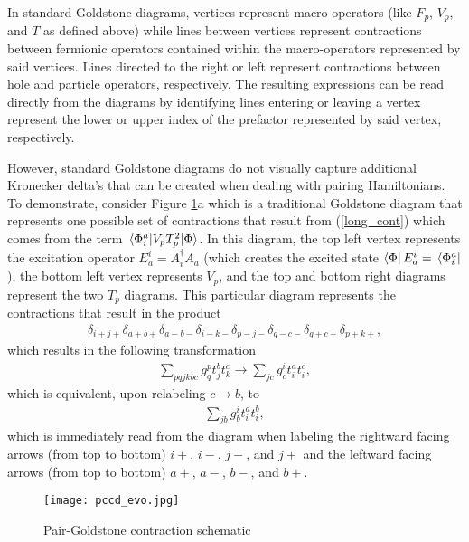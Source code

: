 \documentclass[10pt]{article}
\begin{document}
In standard Goldstone diagrams, vertices represent macro-operators (like $F_p$, $V_p$, and $T$ as defined above) while lines between vertices represent contractions between fermionic operators contained within the macro-operators represented by said vertices. Lines directed to the right or left represent contractions between hole and particle operators, respectively. The resulting expressions can be read directly from the diagrams by identifying lines entering or leaving a vertex represent the lower or upper index of the prefactor represented by said vertex, respectively. 

However, standard Goldstone diagrams do not visually capture additional Kronecker delta's that can be created when dealing with pairing Hamiltonians. To demonstrate, consider Figure \ref{fig:pgd_cont}a which is a traditional Goldstone diagram that represents one possible set of contractions that result from (\ref{long_cont}) which comes from the term $\mel*{\Phi^a_i}{V_pT^2_p}{\Phi}$. In this diagram, the top left vertex represents the excitation operator $E^i_a= A^\dagger_iA_a$ (which creates the excited state $\bra{\Phi}E_a^i=\bra*{\Phi^a_i}$), the bottom left vertex represents $V_p$, and the top and bottom right diagrams represent the two $T_p$ diagrams. This particular diagram represents the contractions that result in the product 
\begin{align}
\delta_{i+j+}\delta_{a+b+}\delta_{a-b-}\delta_{i-k-}\delta_{p-j-}\delta_{q-c-}\delta_{q+c+}\delta_{p+k+}
,\end{align}
which results in the following transformation
\begin{align}
\sum_{pqjkbc}g^p_qt^b_jt^c_k\to\sum_{jc}g^i_ct^a_it^c_i
,\end{align}
which is equivalent, upon relabeling $c\to b$, to
\begin{align}
\label{pgd_final}
\sum_{jb}g^i_bt^a_it^b_i
,\end{align}
which is immediately read from the diagram when labeling the rightward facing arrows (from top to bottom) $i+$, $i-$, $j-$, and $j+$ and the leftward facing arrows (from top to bottom) $a+$, $a-$, $b-$, and $b+$.

\begin{figure}[t]
    \centering
    \texttt{[image: pccd\_evo.jpg]}
    \caption{Pair-Goldstone contraction schematic}
    \label{fig:pgd_cont}
\end{figure}
\end{document}
